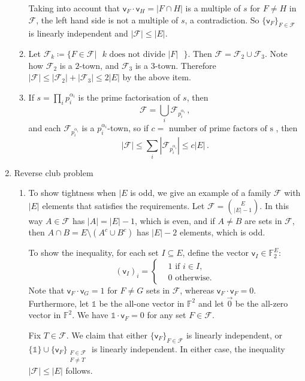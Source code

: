\documentclass[kulak]{tplt}
\theoremstyle{definition}
\newcommand{\F}{\mathbb{F}}
\newcommand{\FF}{\mathcal F}
\newcommand{\vv}{\mathsf{v}}
\begin{document}
\begin{enumerate}
\begin{enumerate}
Taking into account that $\vv_F \cdot \vv_H = |F \cap H|$ is a multiple of $s$ for $F\neq H$ in $\FF$, the left hand side is not a multiple of $s$, a contradiction.
So $\{\vv_F\}_{F\in \FF}$ is linearly independent and $|\FF | \leq |E|$.

\item 
Let $\FF_k \coloneqq \{F \in \FF | \text{ $k$ does not divide $|F|$ } \}$.
Then $\FF = \FF_2 \cup \FF_3$.
Note how $\FF_2$ is a $2$-town, and $\FF_3$ is a $3$-town.
Therefore $|\FF| \leq |\FF_2| + |\FF_3| \leq 2|E|$ by the above item.


\item
If $s = \prod_i p_i^{\alpha_i}$ is the prime factorisation of $s$, then 
$$ \FF = \bigcup_i \FF_{p_i^{\alpha_i}}\, , $$
and each $\FF_{p_i^{\alpha_i}}$ is a $p_i^{\alpha_i}$-town, so if $c = \text{ number of prime factors of s }$, then
$$|\FF | \leq \sum_i |\FF_{p_i^{\alpha_i}}| \leq c |E| \, . $$
\end{enumerate}

\vspace{.8cm}

\item Reverse club problem

\begin{enumerate}
\item 
To show tightness when $|E$ is odd, we give an example of a family $\FF$ with $|E|$ elements that satisfies the requirements.
Let $\FF = \binom{E}{|E| - 1}$.
In this way $A \in \FF $ has $|A| = |E| - 1$, which is even, and if $A\neq B $ are sets in $\FF$, then $A\cap B = E\setminus (A^c \cup B^c) $ has $|E| - 2$ elements, which is odd.

To show the inequality, for each set $I \subseteq E$, define the vector $\vv_I \in \F_2^E$:
$$ (\vv_I)_i =\begin{cases*}
      & 1 \text{ if $i \in I$,}\\
      & 0 \text{ otherwise.}
    \end{cases*} $$
Note that $\vv_F \cdot \vv_G = 1$ for $F\neq G$ sets in $\FF$, whereas $\vv_F \cdot \vv_F = 0$.
Furthermore, let $\mathbb{1} $ be the all-one vector in $\F^2$ and let $\vec{0}$ be the all-zero vector in $\F^2$.
We have $\mathbb{1} \cdot \vv_F = 0$ for any set $F \in \FF$.


Fix $T \in \FF$.
We claim that either $\{\vv_F\}_{F \in \FF}$ is linearly independent, or $\{\mathbb{1}\} \cup \{\vv_F\}_{\substack{F \in \FF \\ F \neq T}}$ is linearly independent.
In either case, the inequality $|\FF| \leq |E|$ follows.


\end{enumerate}
\end{enumerate}
\end{document}
